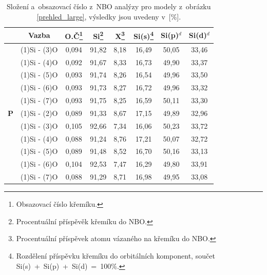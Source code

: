 \documentclass[
digital, %
table,   %
lof,     %
lot,     %
oneside,
]{fithesis3}
\begin{document}
\begin{table}[H]
\caption{Složení a~obsazovací číslo z~NBO analýzy pro modely z~obrázku \ref{prehled_large}, výsledky jsou uvedeny v~[\%].}
\begin{minipage}{\textwidth}
\begin{center}
\begin{tabular}{|l|c|c|c|c|c|c|c|}
\hline
\label{nbo_large}&  Vazba & O.Č\footnote{Obsazovací číslo křemíku.} & Si\footnote{Procentuální příspěvěk křemíku do NBO.} & X\footnote{Procentuální příspěvek atomu vázaného na křemíku do NBO.} & Si(s)\footnote{Rozdělení příspěvku křemíku do orbitálních komponent, součet Si(s)~+~Si(p)~+~Si(d)~=~100\%.} & Si(p)$^d$ &Si(d)$^d$ \\ \hline
& (1)Si - (3)O  & 0,094 & 91,82   & 8,18   & 16,49   & 50,05   & 33,46   \\ \hline
&  (1)Si - (4)O  & 0,092 & 91,67   & 8,33   & 16,73   & 49,90   & 33,37   \\ \hline
& (1)Si - (5)O & 0,093 & 91,74   & 8,26   & 16,54   & 49,96   & 33,50   \\ \hline
&  (1)Si - (6)O & 0,093 & 91,73   & 8,27   & 16,72   & 49,96   & 33,32   \\ \hline
& (1)Si - (7)O& 0,093 & 91,75   & 8,25   & 16,59   & 50,11   & 33,30   \\ \hline
\textbf{P}& (1)Si - (2)O  & 0,089 & 91,33   & 8,67   & 17,15   & 49,89   & 32,96   \\ \hline
&  (1)Si - (3)O  & 0,105 & 92,66   & 7,34   & 16,06   & 50,23   & 33,72   \\ \hline
&  (1)Si - (4)O   & 0,088 & 91,24   & 8,76   & 17,21   & 50,07   & 32,72   \\ \hline
& (1)Si - (5)O  & 0,089 & 91,48   & 8,52   & 16,70   & 50,16   & 33,13   \\ \hline
&  (1)Si - (6)O & 0,104 & 92,53   & 7,47   & 16,29   & 49,80   & 33,91   \\ \hline
&  (1)Si - (7)O & 0,088 & 91,29   & 8,71   & 16,98   & 49,95   & 33,08   \\ \hline
\end{tabular}\end{center}\end{minipage}\end{table}
\end{document}
